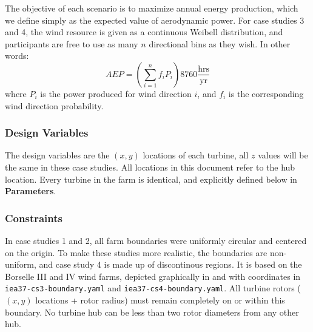\documentclass[10pt]{article}
\begin{document}
        The objective of each scenario is to maximize annual energy production, which we define simply as the expected value of aerodynamic power.
        For case studies 3 and 4, the wind resource is given as a continuous Weibell distribution, and participants are free to use as many $n$ directional bins as they wish.
        In other words:
        \begin{equation*}
            AEP = \left(\sum_{i=1}^{n} f_i P_i\right) 8760 \frac{\textrm{hrs}}{\textrm{yr}}
        \end{equation*}
        where $P_i$ is the power produced for wind direction $i$, and $f_i$ is the corresponding wind direction probability.

    \subsubsection*{Design Variables}

        The design variables are the $(x, y)$ locations of each turbine, all $z$ values will be the same in these case studies.
        All locations in this document refer to the hub location.
        Every turbine in the farm is identical, and explicitly defined below in \textbf{Parameters}.

    \subsubsection*{Constraints}

        In case studies 1 and 2, all farm boundaries were uniformly circular and centered on the origin.
        To make these studies more realistic, the boundaries are non-uniform, and case study 4 is made up of discontinous regions.
        It is based on the Borselle III and IV wind farms, depicted graphically in  and with coordinates in \texttt{iea37-cs3-boundary.yaml} and \texttt{iea37-cs4-boundary.yaml}.
        All turbine rotors ($(x, y)$ locations + rotor radius) must remain completely on or within this boundary.
        No turbine hub can be less than two rotor diameters from any other hub.

\end{document}
